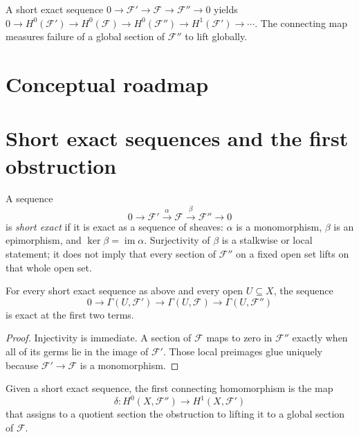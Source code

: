 \begin{example}\label{ex:vi48-expand-01}
A short exact sequence $0\to\mathcal F'\to\mathcal F\to\mathcal F''\to0$ yields $0\to H^0(\mathcal F')\to H^0(\mathcal F)\to H^0(\mathcal F'')\to H^1(\mathcal F')\to\cdots$.  The connecting map measures failure of a global section of $\mathcal F''$ to lift globally.
\end{example}
\section*{Conceptual roadmap}


\section{Short exact sequences and the first obstruction}
\begin{definition}\label{def:vi48-short-exact}
A sequence
\[
0\longrightarrow\mathcal F'\xrightarrow{\alpha}\mathcal F\xrightarrow{\beta}\mathcal F''\longrightarrow0
\]
is \emph{short exact} if it is exact as a sequence of sheaves: $\alpha$ is a monomorphism, $\beta$ is an epimorphism, and $\ker\beta=\operatorname{im}\alpha$.  Surjectivity of $\beta$ is a stalkwise or local statement; it does not imply that every section of $\mathcal F''$ on a fixed open set lifts on that whole open set.
\end{definition}


\begin{proposition}\label{prop:vi48-left-exact}
For every short exact sequence as above and every open $U\subseteq X$, the sequence
\[
0\to\Gamma(U,\mathcal F')\to\Gamma(U,\mathcal F)\to\Gamma(U,\mathcal F'')
\]
is exact at the first two terms.
\begin{proof}
Injectivity is immediate.  A section of $\mathcal F$ maps to zero in $\mathcal F''$ exactly when all of its germs lie in the image of $\mathcal F'$.  Those local preimages glue uniquely because $\mathcal F'\to\mathcal F$ is a monomorphism.
\end{proof}
\end{proposition}

\begin{definition}\label{def:vi48-connecting}
Given a short exact sequence, the first connecting homomorphism is the map
\[
\delta:H^0(X,\mathcal F'')\longrightarrow H^1(X,\mathcal F')
\]
that assigns to a quotient section the obstruction to lifting it to a global section of $\mathcal F$.
\end{definition}

